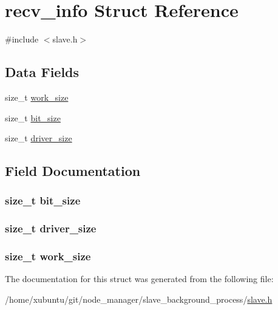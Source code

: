 \hypertarget{structrecv__info}{}\section{recv\+\_\+info Struct Reference}
\label{structrecv__info}


{\ttfamily \#include $<$slave.\+h$>$}

\subsection*{Data Fields}
\begin{DoxyCompactItemize}
\item 
size\+\_\+t \hyperlink{structrecv__info_a47d3ed842b58b72031bd0bf5be417329}{work\+\_\+size}
\item 
size\+\_\+t \hyperlink{structrecv__info_ae31b82c049992e03a55d2c06bb02714b}{bit\+\_\+size}
\item 
size\+\_\+t \hyperlink{structrecv__info_adb61a9c79b71ce061c202603f2cc2255}{driver\+\_\+size}
\end{DoxyCompactItemize}


\subsection{Field Documentation}
\hypertarget{structrecv__info_ae31b82c049992e03a55d2c06bb02714b}{}
\subsubsection[{bit\+\_\+size}]{\setlength{\rightskip}{0pt plus 5cm}size\+\_\+t bit\+\_\+size}\label{structrecv__info_ae31b82c049992e03a55d2c06bb02714b}
\hypertarget{structrecv__info_adb61a9c79b71ce061c202603f2cc2255}{}
\subsubsection[{driver\+\_\+size}]{\setlength{\rightskip}{0pt plus 5cm}size\+\_\+t driver\+\_\+size}\label{structrecv__info_adb61a9c79b71ce061c202603f2cc2255}
\hypertarget{structrecv__info_a47d3ed842b58b72031bd0bf5be417329}{}
\subsubsection[{work\+\_\+size}]{\setlength{\rightskip}{0pt plus 5cm}size\+\_\+t work\+\_\+size}\label{structrecv__info_a47d3ed842b58b72031bd0bf5be417329}


The documentation for this struct was generated from the following file\+:\begin{DoxyCompactItemize}
\item 
/home/xubuntu/git/node\+\_\+manager/slave\+\_\+background\+\_\+process/\hyperlink{slave_8h}{slave.\+h}\end{DoxyCompactItemize}
